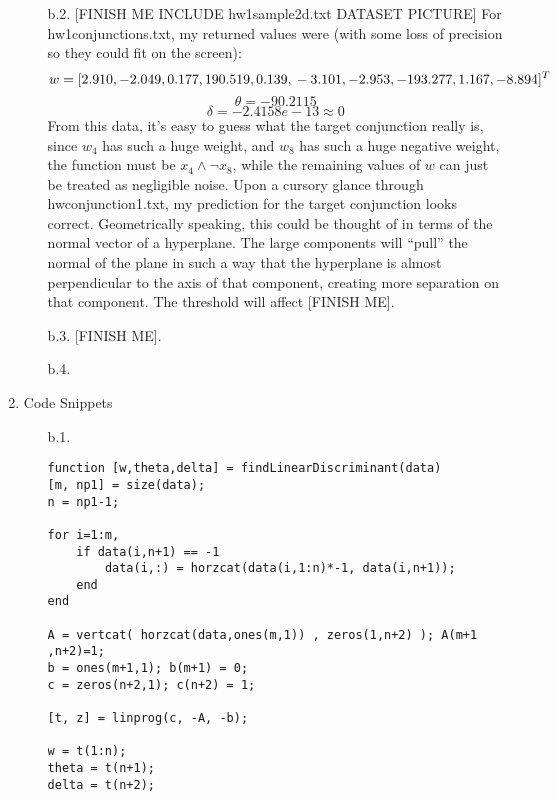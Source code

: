 \begin{enumerate}
\begin{enumerate}
        \item[b.2.]
                [FINISH ME INCLUDE hw1sample2d.txt DATASET PICTURE]
                For hw1conjunctions.txt, my returned values were (with some loss of precision so they could fit on the screen):
                    $$w = [2.910,
                          -2.049,
                           0.177,
                           190.519,
                           0.139,\\
                          -3.101,
                          -2.953,
                          -193.277,
                           1.167,
                          -8.894]^T$$
                    $$\theta = -90.2115$$
                    $$\delta = -2.4158e-13 \approx 0$$
               From this data, it's easy to guess what the target conjunction really is, since $w_4$ has such a huge weight, and $w_8$ has such a huge negative weight, the function must be $x_4 \land \neg x_8$, while the remaining values of $w$ can just be treated as negligible noise. Upon a cursory glance through hwconjunction1.txt, my prediction for the target conjunction looks correct. Geometrically speaking, this could be thought of in terms of the normal vector of a hyperplane. The large components will ``pull'' the normal of the plane in such a way that the hyperplane is almost perpendicular to the axis of that component, creating more separation on that component. The threshold will affect [FINISH ME].
        \item[b.3.]
                [FINISH ME].
        \item[b.4.]
                 
                
      \end{enumerate}
\item Code Snippets
      \begin{enumerate}
      \item [b.1.]
      \begin{verbatim}
function [w,theta,delta] = findLinearDiscriminant(data)
[m, np1] = size(data);
n = np1-1;

for i=1:m,
    if data(i,n+1) == -1
        data(i,:) = horzcat(data(i,1:n)*-1, data(i,n+1));
    end
end

A = vertcat( horzcat(data,ones(m,1)) , zeros(1,n+2) ); A(m+1 ,n+2)=1;
b = ones(m+1,1); b(m+1) = 0;
c = zeros(n+2,1); c(n+2) = 1;

[t, z] = linprog(c, -A, -b);

w = t(1:n);
theta = t(n+1);
delta = t(n+2);


\end{verbatim}
\end{enumerate}
\end{enumerate}
